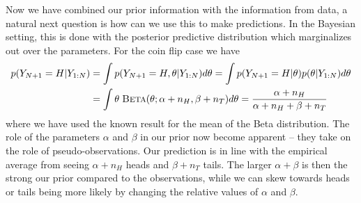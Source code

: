 Now we have combined  our prior information with the information from data, a natural
next question is how can we use this to make predictions.  In the Bayesian setting,
this is done with the posterior predictive distribution which marginalizes out over
the parameters.  For the coin flip case we have
\begin{align}
\label{eq:bayes:post-pred}
p( Y_{N+1}=H | Y_{1:N}) &= \int p(Y_{N+1}=H, \theta | Y_{1:N}) d\theta
= \int p(Y_{N+1}=H | \theta) p(\theta | Y_{1:N})  d\theta \nonumber \\
&= \int  \theta \; \textsc{Beta}(\theta ; \alpha+n_H, \beta+n_T) d\theta 
=\frac{\alpha+n_H}{\alpha+n_H+\beta+n_T}
\end{align}
where we have used the known result for the mean of the Beta distribution.
The role of the parameters $\alpha$ and $\beta$ in our prior now become apparent
-- they take on the role of pseudo-observations.  Our prediction is in line with the
empirical average from seeing $\alpha+n_H$ heads and $\beta+n_T$ tails.  The larger
$\alpha+\beta$ is then the strong our prior compared to the observations, while we
can skew towards heads or tails being more likely by changing the relative values of $\alpha$
and $\beta$.

